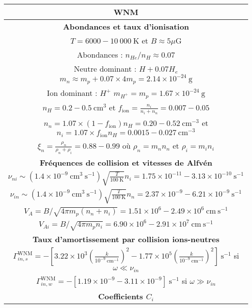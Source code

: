 \documentclass[10pt,a4paper]{article}
\begin{document}
\begin{center}
\begin{tabular}{|c|}
\hline
WNM \\
\hline
\hline  
\bf{Abondances et taux d'ionisation}\\ 
\hline
$T = 6000 - 10~000~\mathrm{K}$ et $B \approx 5 \mu\mathrm{G}$ \\  
Abondances : $n_{He}/n_H \approx 0.07$ \\ 
Neutre dominant : $H+0.07H_e$ $m_n \approx m_p + 0.07\times 4 m_p = 2.14 \times 10^{-24}~\mathrm{g}$ \\ 
Ion dominant : $H^+$ $m_{H^+} = m_p = 1.67 \times 10^{-24}~\mathrm{g}$    \\
\hline
$n_H = 0.2 - 0.5~\mathrm{cm}^3$ et $f_\mathrm{ion} = \frac{n_i}{n_i+n_n} = 0.007-0.05$ \\ 
$n_n = 1.07\times (1-f_\mathrm{ion})n_H = 0.20-0.52~\mathrm{cm}^{-3}$ et $n_i = 1.07\times f_\mathrm{ion}n_H = 0.0015 - 0.027~\mathrm{cm}^{-3}$ \\
$\xi_n = \frac{\rho_n}{\rho_n+\rho_i} = 0.88 - 0.99$ où $\rho_n = m_n n_n$ et $\rho_i = m_i n_i$ \\ 
\hline
\hline
\bf{Fréquences de collision et vitesses de Alfvén}\\
\hline
$\nu_{ni} \sim (1.4\times 10^{-9}~\mathrm{cm}^3~\mathrm{s}^{-1}) \sqrt{\frac{T}{100~\mathrm{K}}}n_i = 1.75\times 10^{-11} - 3.13\times 10^{-10}~\mathrm{s}^{-1}$ \\ 
$\nu_{in} \sim (1.4\times 10^{-9}~\mathrm{cm}^3~\mathrm{s}^{-1}) \sqrt{\frac{T}{100~\mathrm{K}}}n_n = 2.37\times 10^{-9} - 6.21\times 10^{-9}~\mathrm{s}^{-1}$ \\ 
\hline 
$V_A = B/\sqrt{4\pi m_p (n_n +n_i)} = 1.51\times 10^6 - 2.49 \times 10^6 ~\mathrm{cm}~\mathrm{s}^{-1}$ \\ 
$V_{Ai} = B/\sqrt{4\pi m_p n_i} = 6.90\times 10^6 - 2.91\times 10^7~\mathrm{cm}~\mathrm{s}^{-1}$ \\ 
\hline 
\hline
\bf{Taux d'amortissement par collision ions-neutres} \\ 
\hline
$\Gamma^\mathrm{WNM}_{in,s} = - \left[ 3.22\times 10^{3} \left( \frac{k}{10^{-9}~\mathrm{cm}^{-1}} \right)^2 - 1.77\times 10^{5} \left( \frac{k}{10^{-9}~\mathrm{cm}^{-1}} \right)^2 \right]~\mathrm{s}^{-1}$ si $\omega \ll \nu_{in}$ \\ 
$\Gamma^\mathrm{WNM}_{in,w} = - \left[ 1.19\times 10^{-9} - 3.11 \times 10^{-9} \right]~\mathrm{s}^{-1}$ si $\omega \gg \nu_{in}$ \\
\hline
\hline
\bf{Coefficients $C_i$} \\

\end{tabular}
\end{center}
\end{document}
